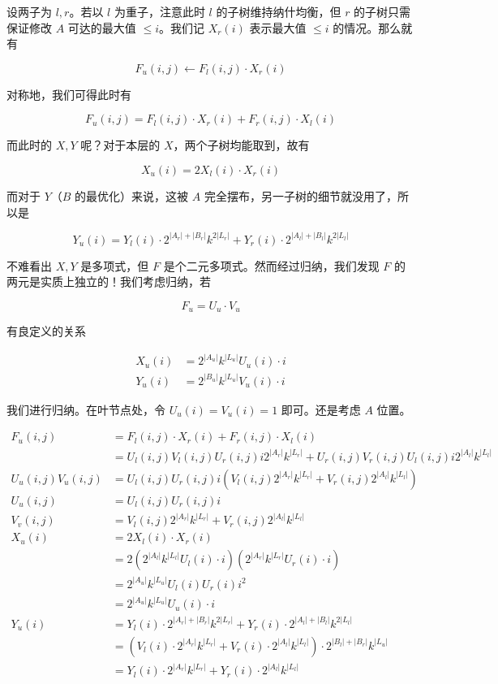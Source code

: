 \documentclass[12pt]{ctexart}
\theoremstyle{theorem}
\theoremstyle{theorem}
\begin{document}
设两子为 $l, r$。若以 $l$ 为重子，注意此时 $l$ 的子树维持纳什均衡，但 $r$ 的子树只需保证修改 $A$ 可达的最大值 $\le i$。我们记 $X_r(i)$ 表示最大值 $\le i$ 的情况。那么就有

$$
F_u(i,j) \leftarrow F_l(i,j) \cdot X_r(i)
$$

对称地，我们可得此时有

$$
F_u(i,j) = F_l(i,j) \cdot X_r(i) + F_r(i,j) \cdot X_l(i)
$$

而此时的 $X,Y$ 呢？对于本层的 $X$，两个子树均能取到，故有

$$
X_u(i) = 2X_l(i)\cdot X_r(i)
$$

而对于 $Y$（$B$ 的最优化）来说，这被 $A$ 完全摆布，另一子树的细节就没用了，所以是

$$
Y_u(i) = Y_l(i) \cdot 2^{|A_r|+|B_r|}k^{2|L_r|} + Y_r(i) \cdot 2^{|A_l|+|B_l|}k^{2|L_l|}
$$

不难看出 $X,Y$ 是多项式，但 $F$ 是个二元多项式。然而经过归纳，我们发现 $F$ 的两元是实质上独立的！我们考虑归纳，若

$$
F_u = U_u \cdot V_u
$$

有良定义的关系

$$
\begin{aligned}
X_u(i) &= 2^{|A_u|} k^{|L_u|} U_u(i)\cdot i\\
Y_u(i) &= 2^{|B_u|} k^{|L_u|} V_u(i)\cdot i
\end{aligned}
$$

我们进行归纳。在叶节点处，令 $U_u(i)=V_u(i)=1$ 即可。还是考虑 $A$ 位置。

$$
\begin{aligned}
F_u(i,j) &= F_l(i,j) \cdot X_r(i) + F_r(i,j) \cdot X_l(i)\\
&= U_l(i,j)V_l(i,j)U_r(i,j)i 2^{|A_r|} k^{|L_r|} +U_r(i,j)V_r(i,j)U_l(i,j)i 2^{|A_l|} k^{|L_l|}\\
U_u(i,j)V_u(i,j)&= U_l(i,j)U_r(i,j) i\left( V_l(i,j) 2^{|A_r|} k^{|L_r|}+ V_r(i,j) 2^{|A_l|} k^{|L_l|} \right)\\
U_u(i,j)&=U_l(i,j)U_r(i,j) i\\
V_v(i,j)&=V_l(i,j) 2^{|A_r|} k^{|L_r|}+ V_r(i,j) 2^{|A_l|} k^{|L_l|}\\
X_u(i)&=2 X_l(i)\cdot X_r(i)\\
&=2 \left(2^{|A_l|} k^{|L_l|} U_l(i)\cdot i\right) \left(2^{|A_r|} k^{|L_r|} U_r(i)\cdot i\right)\\
&=2^{|A_u|}k^{|L_u|} U_l(i)U_r(i)i^2\\
&=2^{|A_u|}k^{|L_u|} U_u(i)\cdot i\\
Y_u(i)&= Y_l(i) \cdot 2^{|A_r|+|B_r|}k^{2|L_r|} + Y_r(i) \cdot 2^{|A_l|+|B_l|}k^{2|L_l|}\\
&= \left( V_l(i) \cdot 2^{|A_r|}k^{|L_r|} + V_r(i) \cdot 2^{|A_l|}k^{|L_l|} \right)\cdot 2^{|B_l|+|B_r|} k^{|L_u|}\\
&= Y_l(i) \cdot 2^{|A_r|}k^{|L_r|} + Y_r(i) \cdot 2^{|A_l|}k^{|L_l|} 
\end{aligned}
$$
\end{document}
